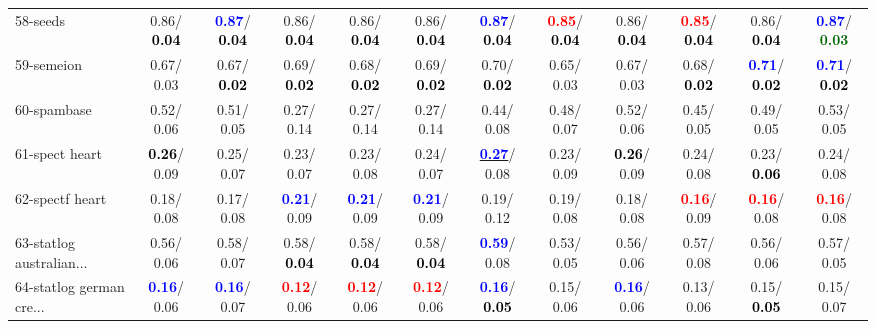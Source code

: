 \begin{table}[h]
\begin{center}
{\begin{tabular}{lc|c|c|c|c|c|c|c|c|c|c}
58-seeds &   0.86/\textcolor{black}{\textbf{  0.04}} & \textcolor{blue}{\textbf{  0.87}}/\textcolor{black}{\textbf{  0.04}} &   0.86/\textcolor{black}{\textbf{  0.04}} &   0.86/\textcolor{black}{\textbf{  0.04}} &   0.86/\textcolor{black}{\textbf{  0.04}} & \textcolor{blue}{\textbf{  0.87}}/\textcolor{black}{\textbf{  0.04}} & \textcolor{red}{\textbf{  0.85}}/\textcolor{black}{\textbf{  0.04}} &   0.86/\textcolor{black}{\textbf{  0.04}} & \textcolor{red}{\textbf{  0.85}}/\textcolor{black}{\textbf{  0.04}} &   0.86/\textcolor{black}{\textbf{  0.04}} & \textcolor{blue}{\textbf{  0.87}}/\textcolor{darkgreen}{\textbf{  0.03}} \\
59-semeion &   0.67/  0.03 &   0.67/\textcolor{black}{\textbf{  0.02}} &   0.69/\textcolor{black}{\textbf{  0.02}} &   0.68/\textcolor{black}{\textbf{  0.02}} &   0.69/\textcolor{black}{\textbf{  0.02}} &   0.70/\textcolor{black}{\textbf{  0.02}} &   0.65/  0.03 &   0.67/  0.03 &   0.68/\textcolor{black}{\textbf{  0.02}} & \textcolor{blue}{\textbf{  0.71}}/\textcolor{black}{\textbf{  0.02}} & \textcolor{blue}{\textbf{  0.71}}/\textcolor{black}{\textbf{  0.02}} \\
60-spambase &   0.52/  0.06 &   0.51/  0.05 &   0.27/  0.14 &   0.27/  0.14 &   0.27/  0.14 &   0.44/  0.08 &   0.48/  0.07 &   0.52/  0.06 &   0.45/  0.05 &   0.49/  0.05 &   0.53/  0.05 \\ \hline
61-spect heart & \textcolor{black}{\textbf{  0.26}}/  0.09 &   0.25/  0.07 &   0.23/  0.07 &   0.23/  0.08 &   0.24/  0.07 & \underline{\textcolor{blue}{\textbf{  0.27}}}/  0.08 &   0.23/  0.09 & \textcolor{black}{\textbf{  0.26}}/  0.09 &   0.24/  0.08 &   0.23/\textcolor{black}{\textbf{  0.06}} &   0.24/  0.08 \\
62-spectf heart &   0.18/  0.08 &   0.17/  0.08 & \textcolor{blue}{\textbf{  0.21}}/  0.09 & \textcolor{blue}{\textbf{  0.21}}/  0.09 & \textcolor{blue}{\textbf{  0.21}}/  0.09 &   0.19/  0.12 &   0.19/  0.08 &   0.18/  0.08 & \textcolor{red}{\textbf{  0.16}}/  0.09 & \textcolor{red}{\textbf{  0.16}}/  0.08 & \textcolor{red}{\textbf{  0.16}}/  0.08 \\
63-statlog australian... &   0.56/  0.06 &   0.58/  0.07 &   0.58/\textcolor{black}{\textbf{  0.04}} &   0.58/\textcolor{black}{\textbf{  0.04}} &   0.58/\textcolor{black}{\textbf{  0.04}} & \textcolor{blue}{\textbf{  0.59}}/  0.08 &   0.53/  0.05 &   0.56/  0.06 &   0.57/  0.08 &   0.56/  0.06 &   0.57/  0.05 \\
64-statlog german cre... & \textcolor{blue}{\textbf{  0.16}}/  0.06 & \textcolor{blue}{\textbf{  0.16}}/  0.07 & \textcolor{red}{\textbf{  0.12}}/  0.06 & \textcolor{red}{\textbf{  0.12}}/  0.06 & \textcolor{red}{\textbf{  0.12}}/  0.06 & \textcolor{blue}{\textbf{  0.16}}/\textcolor{black}{\textbf{  0.05}} &   0.15/  0.06 & \textcolor{blue}{\textbf{  0.16}}/  0.06 &   0.13/  0.06 &   0.15/\textcolor{black}{\textbf{  0.05}} &   0.15/  0.07 \\\end{tabular}}\label{stratsALCKappa1a5NN}
\end{center}
\end{table}
